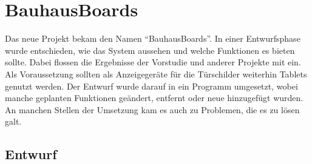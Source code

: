 \chapter{BauhausBoards}\label{BauhausBoards}
Das neue Projekt bekam den Namen ``BauhausBoards''.
In einer Entwurfsphase wurde entschieden, wie das System aussehen und welche Funktionen es bieten sollte. Dabei flossen die Ergebnisse der Vorstudie und anderer Projekte mit ein.
\\
Als Voraussetzung sollten als Anzeigegeräte für die Türschilder weiterhin Tablets genutzt werden.
Der Entwurf wurde darauf in ein Programm umgesetzt, wobei manche geplanten Funktionen geändert, entfernt oder neue hinzugefügt wurden. An manchen Stellen der Umsetzung kam es auch zu Problemen, die es zu lösen galt.

\section{Entwurf}\label{Entwurf}
